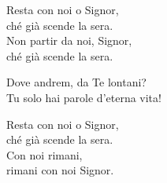 
Resta con noi o Signor,\\
ché già scende la sera.\\
Non partir da noi, Signor,\\
ché già scende la sera.	

\spazio

Dove andrem, da Te lontani?\\
Tu solo hai parole d'eterna vita!

\spazio

Resta con noi o Signor,\\
ché già scende la sera.\\
Con noi rimani,\\
rimani con noi Signor.
